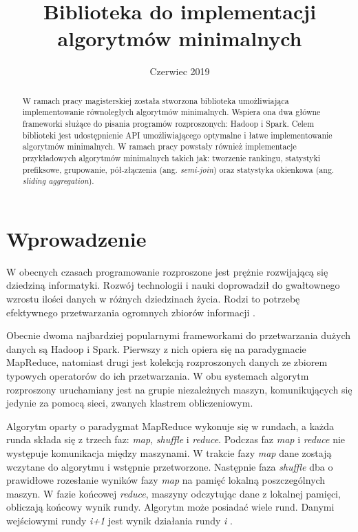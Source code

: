 \documentclass[licencjacka]{pracamgr}
\title{Biblioteka do implementacji algorytmów minimalnych}
\date{Czerwiec 2019}
\begin{document}
\maketitle

\begin{abstract}
 W ramach pracy magisterskiej została stworzona biblioteka umożliwiająca implementowanie równoległych algorytmów minimalnych. Wspiera ona dwa główne frameworki służące do pisania programów rozproszonych: Hadoop i Spark. Celem biblioteki jest udostępnienie API umożliwiającego optymalne i łatwe implementowanie algorytmów minimalnych. W ramach pracy powstały również implementacje przykładowych algorytmów minimalnych takich jak: tworzenie rankingu, statystyki prefiksowe, grupowanie, pół-złączenia (ang. \textit{semi-join}) oraz statystyka okienkowa (ang. \textit{sliding aggregation}).
\end{abstract}

\tableofcontents

\chapter{Wprowadzenie}

W obecnych czasach programowanie rozproszone jest prężnie rozwijającą się dziedziną informatyki. Rozwój technologii i nauki doprowadził do gwałtownego wzrostu ilości danych w różnych dziedzinach życia. Rodzi to potrzebę efektywnego przetwarzania ogromnych zbiorów informacji \cite{watson2014tutorial, wu2013data}.

Obecnie dwoma najbardziej popularnymi frameworkami do przetwarzania dużych danych są Hadoop i Spark. Pierwszy z nich opiera się na paradygmacie MapReduce, natomiast drugi jest kolekcją rozproszonych danych ze zbiorem typowych operatorów do ich przetwarzania. W obu systemach algorytm rozproszony uruchamiany jest na grupie niezależnych maszyn, komunikujących się jedynie za pomocą sieci, zwanych klastrem obliczeniowym.

Algorytm oparty o paradygmat MapReduce wykonuje się w rundach, a każda runda składa się z trzech faz: \textit{map}, \textit{shuffle} i \textit{reduce}. Podczas faz \textit{map} i \textit{reduce} nie występuje komunikacja między maszynami. W trakcie fazy \textit{map} dane zostają wczytane do algorytmu i wstępnie przetworzone. Następnie faza \textit{shuffle} dba o prawidłowe rozesłanie wyników fazy \textit{map} na pamięć lokalną poszczególnych maszyn. W fazie końcowej \textit{reduce}, maszyny odczytując dane z lokalnej pamięci, obliczają końcowy wynik rundy. Algorytm może posiadać wiele rund. Danymi wejściowymi rundy \textit{i+1} jest wynik działania rundy \textit{i} \cite{white2012hadoop, taylor2010overview, shvachko2010hadoop}.
\end{document}
